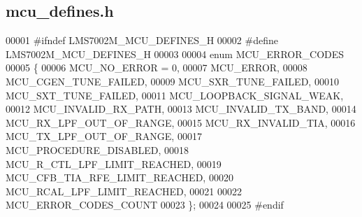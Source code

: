 \subsection{mcu\+\_\+defines.\+h}
\label{mcu__defines_8h_source}

\begin{DoxyCode}
00001 \textcolor{preprocessor}{#ifndef LMS7002M\_MCU\_DEFINES\_H}
00002 \textcolor{preprocessor}{#define LMS7002M\_MCU\_DEFINES\_H}
00003 
00004 \textcolor{keyword}{enum} MCU_ERROR_CODES
00005 \{
00006     MCU_NO_ERROR = 0,
00007     MCU_ERROR,
00008     MCU_CGEN_TUNE_FAILED,
00009     MCU_SXR_TUNE_FAILED,
00010     MCU_SXT_TUNE_FAILED,
00011     MCU_LOOPBACK_SIGNAL_WEAK,
00012     MCU_INVALID_RX_PATH,
00013     MCU_INVALID_TX_BAND,
00014     MCU_RX_LPF_OUT_OF_RANGE,
00015     MCU_RX_INVALID_TIA,
00016     MCU_TX_LPF_OUT_OF_RANGE,
00017     MCU_PROCEDURE_DISABLED,
00018     MCU_R_CTL_LPF_LIMIT_REACHED,
00019     MCU_CFB_TIA_RFE_LIMIT_REACHED,
00020     MCU_RCAL_LPF_LIMIT_REACHED,
00021 
00022     MCU_ERROR_CODES_COUNT
00023 \};
00024 
00025 \textcolor{preprocessor}{#endif}
\end{DoxyCode}
